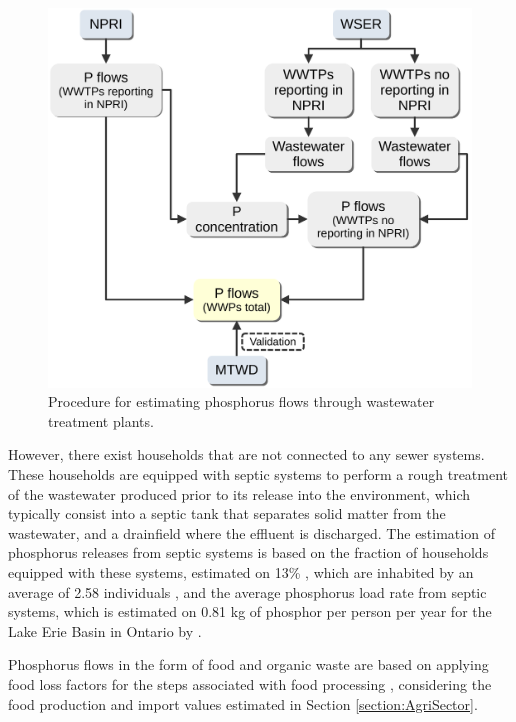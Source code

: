 \documentclass[authoryear]{elsarticle}
\begin{document}
\begin{figure}[H]
	\centering
	\includegraphics[width=0.6\linewidth, trim={0cm 0cm 0cm 0cm},clip]{Figures/FigJorge.pdf} 
	\caption{Procedure for estimating phosphorus flows through wastewater treatment plants.}
	\label{fig:MethodWWTPs}
\end{figure}

However, there exist households that are not connected to any sewer systems. These households are equipped with septic systems to perform a rough treatment of the wastewater produced prior to its release into the environment, which typically consist into a septic tank that separates solid matter from the wastewater, and a drainfield where the effluent is discharged. The estimation of phosphorus releases from septic systems is based on the fraction of households equipped with these systems, estimated on 13\% \citep{CanadaSepticSystems}, which are inhabited by an average of 2.58 individuals \citep{CanadaPersonPerHouse}, and the average phosphorus load rate from septic systems, which is estimated on 0.81 kg of phosphor per person per year for the Lake Erie Basin in Ontario by \citet{oldfield2020estimation}.

Phosphorus flows in the form of food and organic waste are based on applying food loss factors for the steps associated with food processing \citep{FoodLossesFAO}, considering the food production and import values estimated in Section \ref{section:AgriSector}.
\end{document}
